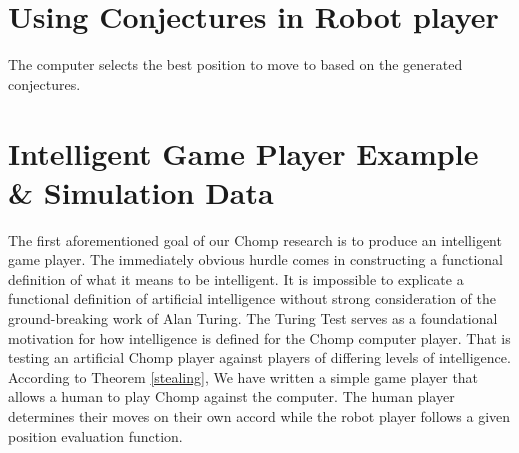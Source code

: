 \documentclass{amsart}
\theoremstyle{definition}
\theoremstyle{remark}
\numberwithin{equation}{section}
\begin{document}
\section{Using Conjectures in Robot player}

The computer selects the best position to move to based on the generated conjectures.






















\section{Intelligent Game Player Example \& Simulation Data}

The first aforementioned goal of our Chomp research is to produce an intelligent game player. The immediately obvious hurdle comes in constructing a functional definition of what it means to be intelligent. It is impossible to explicate a functional definition of artificial intelligence without strong consideration of the ground-breaking work of Alan Turing. The Turing Test serves as a foundational motivation for how intelligence is defined for the Chomp computer player. That is testing an artificial Chomp player against players of differing levels of intelligence. According to Theorem \ref{stealing},  We have written a simple game player that allows a human to play Chomp against the computer.  The human player determines their moves on their own accord while the robot player follows a given position evaluation function.
\end{document}

